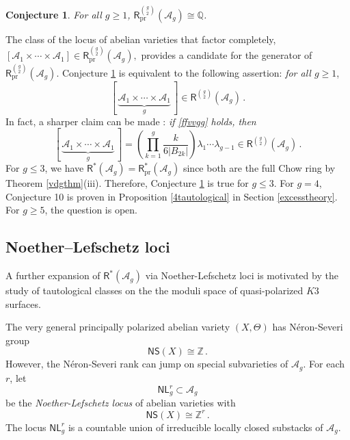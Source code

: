 \documentclass[11pt]{amsart}
\newtheorem{conj}[thm]{Conjecture}
\theoremstyle{definition}
\newcommand{\qq}{\mathbb{Q}}
\begin{document}
\begin{conj}\label{socprod}  For all $g\geq 1$, $\mathsf{R}^{\binom{g}{2}}_{\mathrm{pr}}(\mathcal{A}_{g})  \cong 
\qq$.
\end{conj}

The class of the locus of abelian varieties that
factor completely, 
$[\mathcal{A}_1 \times \cdots\times \mathcal{A}_1] \in \mathsf{R}_{\mathrm{pr}}^{\binom{g}{2}}(\mathcal{A}_g),$
provides
a candidate for the generator of $\mathsf{R}^{\binom{g}{2}}_{\mathrm{pr}}(\mathcal{A}_{g})$.
Conjecture \ref{socprod} is equivalent to
the following assertion: {\em for all $g \geq 1$},
\begin{equation}\label{ffvvgg}
[\, \underbrace{\mathcal{A}_1  \times \cdots\times \mathcal{A}_1}_{g}\, ] \in \mathsf{R}^{\binom{g}{2}}(\mathcal{A}_g)\, .
\end{equation}
In fact, a
sharper claim can be made \cite[Theorem 6]{CMOP}: 
{\em if \eqref{ffvvgg} holds, then}
$$[\, \underbrace{\mathcal{A}_1  \times \cdots\times \mathcal{A}_1}_{g}\, ] =\left(\prod_{k=1}^{g} \frac{k}{6|B_{2k}|}\right) \lambda_{1}\cdots \lambda_{g-1} \in
\mathsf{R}^{\binom{g}{2}}(\mathcal{A}_g)
\, .$$ 
For $g\leq 3$, we have $\mathsf{R}^*(\mathcal{A}_{g}) =
\mathsf{R}^*_{\mathrm{pr}}(\mathcal{A}_{g})$
since both are the full Chow ring by Theorem \ref{vdgthm}(iii). Therefore,  
Conjecture \ref{socprod} is 
true for $g\leq 3$. For $g=4$, 
Conjecture 10 is proven
in Proposition \ref{4tautological} in Section \ref {excesstheory}.
 For $g\geq 5$, the question is open. 


\subsection{Noether--Lefschetz loci}
A further expansion of $\mathsf{R}^*(\mathcal{A}_g)$ via
Noether-Lefschetz loci 
is motivated by the
study of tautological classes \cite{MOP,PY} on the 
the moduli space of quasi-polarized $K3$ surfaces. 

The very general principally
polarized abelian variety $(X,\Theta)$ has N\'eron-Severi group
$$\mathsf{NS}(X)\cong\mathbb{Z}\,.$$
However, the N\'eron-Severi
rank can jump on special subvarieties of $\mathcal{A}_g$.
For each $r$, let
$$\mathsf{NL}^r_g \subset \mathcal{A}_g$$
be the 
{\em Noether-Lefschetz locus} of
abelian varieties with 
$$\mathsf{NS}(X)\cong \mathbb{Z}^r\, .$$
The locus $\mathsf{NL}^r_g$ is a
countable union of irreducible locally closed
substacks of $\mathcal{A}_g$.
\end{document}
